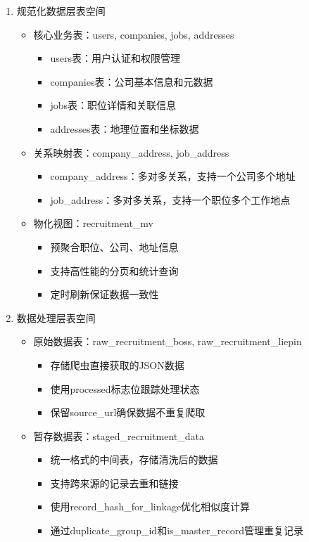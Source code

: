 \begin{enumerate}
  \item 规范化数据层表空间
  \begin{itemize}
    \item 核心业务表：users, companies, jobs, addresses
    \begin{itemize}
      \item users表：用户认证和权限管理
      \item companies表：公司基本信息和元数据
      \item jobs表：职位详情和关联信息
      \item addresses表：地理位置和坐标数据
    \end{itemize}
    \item 关系映射表：company\_address, job\_address
    \begin{itemize}
      \item company\_address：多对多关系，支持一个公司多个地址
      \item job\_address：多对多关系，支持一个职位多个工作地点
    \end{itemize}
    \item 物化视图：recruitment\_mv
    \begin{itemize}
      \item 预聚合职位、公司、地址信息
      \item 支持高性能的分页和统计查询
      \item 定时刷新保证数据一致性
    \end{itemize}
  \end{itemize}

  \item 数据处理层表空间
  \begin{itemize}
    \item 原始数据表：raw\_recruitment\_boss, raw\_recruitment\_liepin
    \begin{itemize}
      \item 存储爬虫直接获取的JSON数据
      \item 使用processed标志位跟踪处理状态
      \item 保留source\_url确保数据不重复爬取
    \end{itemize}
    \item 暂存数据表：staged\_recruitment\_data
    \begin{itemize}
      \item 统一格式的中间表，存储清洗后的数据
      \item 支持跨来源的记录去重和链接
      \item 使用record\_hash\_for\_linkage优化相似度计算
      \item 通过duplicate\_group\_id和is\_master\_record管理重复记录
    \end{itemize}
  \end{itemize}
\end{enumerate}

